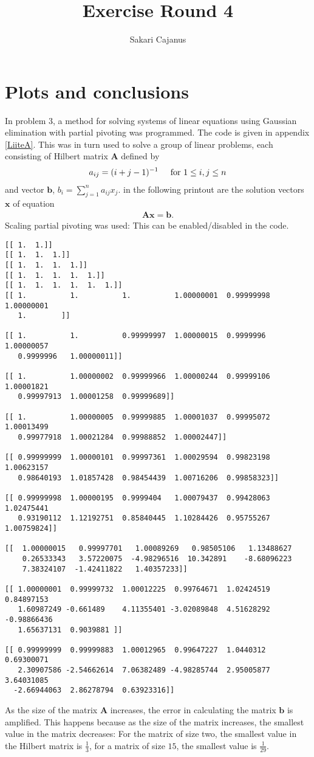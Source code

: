 \documentclass[a4paper,12pt]{scrartcl}
\author{Sakari Cajanus}
\title{Exercise Round 4}{Och samma på English}
\begin{document}
\maketitlepage
\clearpage
{}
\section{Plots and conclusions}
In problem 3, a method for solving systems of linear equations using Gaussian elimination with partial pivoting was programmed. The code is given in appendix \ref{LiiteA}. This was in turn used to solve a group of linear problems, each consisting of Hilbert matrix $\mathbf{A}$ defined by
\begin{align*}
    a_{ij}=(i+j-1)^{-1}\hspace{5mm}\textrm{for } 1\le i,j \le n
\end{align*}
and vector $\mathbf{b}$, $b_i=\sum_{j=1}^n a_{ij}x_j$. in the following printout are the solution vectors $\mathbf{x}$ of equation
\begin{align*}
    \mathbf{Ax}=\mathbf{b}.
\end{align*}
Scaling partial pivoting was used: This can be enabled/disabled in the code.
\begin{verbatim}
[[ 1.  1.]]
[[ 1.  1.  1.]]
[[ 1.  1.  1.  1.]]
[[ 1.  1.  1.  1.  1.]]
[[ 1.  1.  1.  1.  1.  1.]]
[[ 1.          1.          1.          1.00000001  0.99999998  1.00000001
   1.        ]]

[[ 1.          1.          0.99999997  1.00000015  0.9999996   1.00000057
   0.9999996   1.00000011]]

[[ 1.          1.00000002  0.99999966  1.00000244  0.99999106  1.00001821
   0.99997913  1.00001258  0.99999689]]

[[ 1.          1.00000005  0.99999885  1.00001037  0.99995072  1.00013499
   0.99977918  1.00021284  0.99988852  1.00002447]]

[[ 0.99999999  1.00000101  0.99997361  1.00029594  0.99823198  1.00623157
   0.98640193  1.01857428  0.98454439  1.00716206  0.99858323]]

[[ 0.99999998  1.00000195  0.9999404   1.00079437  0.99428063  1.02475441
   0.93190112  1.12192751  0.85840445  1.10284426  0.95755267  1.00759824]]

[[  1.00000015   0.99997701   1.00089269   0.98505106   1.13488627
    0.26533343   3.57220075  -4.98296516  10.342891    -8.68096223
    7.38324107  -1.42411822   1.40357233]]

[[ 1.00000001  0.99999732  1.00012225  0.99764671  1.02424519  0.84897153
   1.60987249 -0.661489    4.11355401 -3.02089848  4.51628292 -0.98866436
   1.65637131  0.9039881 ]]

[[ 0.99999999  0.99999883  1.00012965  0.99647227  1.0440312   0.69300071
   2.30907586 -2.54662614  7.06382489 -4.98285744  2.95005877  3.64031085
  -2.66944063  2.86278794  0.63923316]]

\end{verbatim}
As the size of the matrix $\mathbf{A}$ increases, the error in calculating the matrix $\mathbf{b}$ is amplified. This happens because as the size of the matrix increases, the smallest value in the matrix decreases: For the matrix of size two, the smallest value in the Hilbert matrix is $\frac{1}{3}$, for a matrix of size $15$, the smallest value is $\frac{1}{29}$.
\end{document}
